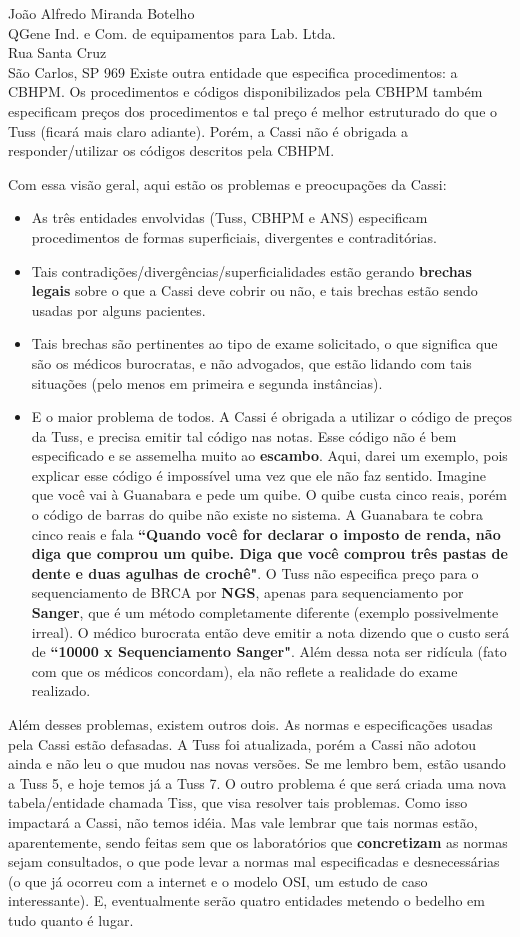 \documentclass{letter}
\begin{document}
\begin{letter}{João Alfredo Miranda Botelho \\ QGene Ind. e Com. de equipamentos para Lab. Ltda. \\ Rua Santa Cruz \\ São Carlos, SP 969}
Existe outra entidade que especifica procedimentos: a CBHPM. Os procedimentos e códigos disponibilizados pela CBHPM também especificam
preços dos procedimentos e tal preço é melhor estruturado do que o Tuss (ficará mais claro adiante). Porém, a Cassi não é obrigada a
responder/utilizar os códigos descritos pela CBHPM.

Com essa visão geral, aqui estão os problemas e preocupações da Cassi:
\begin{itemize}
\item As três entidades envolvidas (Tuss, CBHPM e ANS) especificam procedimentos de formas superficiais, divergentes e contraditórias.
\item Tais contradições/divergências/superficialidades estão gerando \textbf{brechas legais} sobre o que a Cassi deve cobrir ou não, e tais
brechas estão sendo usadas por alguns pacientes.
\item Tais brechas são pertinentes ao tipo de exame solicitado, o que significa que são os médicos burocratas, e não advogados, que estão lidando
com tais situações (pelo menos em primeira e segunda instâncias).
\item E o maior problema de todos. A Cassi é obrigada a utilizar o código de preços da Tuss, e precisa emitir tal código nas notas. 
Esse código não é bem especificado e se assemelha muito ao \textbf{escambo}. Aqui, darei um exemplo, pois explicar esse código 
é impossível uma vez que ele não faz sentido. Imagine que você vai à Guanabara e pede um quibe. O quibe custa cinco reais, porém o código
de barras do quibe não existe no sistema. A Guanabara te cobra cinco reais e fala \textbf{``Quando você for declarar o imposto de renda, não diga
que comprou um quibe. Diga que você comprou três pastas de dente e duas agulhas de crochê"}. O Tuss não especifica preço para o sequenciamento
de BRCA por \textbf{NGS}, apenas para sequenciamento por \textbf{Sanger}, que é um método completamente diferente (exemplo possivelmente irreal). 
O médico burocrata então deve emitir a nota dizendo que o custo será de \textbf{``10000 x Sequenciamento Sanger"}. 
Além dessa nota ser ridícula (fato com que os médicos concordam), ela não reflete a realidade do exame realizado.
\end{itemize}

Além desses problemas, existem outros dois. As normas e especificações usadas pela Cassi estão defasadas. A Tuss foi atualizada, porém a Cassi não
adotou ainda e não leu o que mudou nas novas versões. Se me lembro bem, estão usando a Tuss 5, e hoje temos já a Tuss 7. O outro problema é que
será criada uma nova tabela/entidade chamada Tiss, que visa resolver tais problemas. Como isso impactará a Cassi, não temos idéia. Mas vale lembrar que
tais normas estão, aparentemente, sendo feitas sem que os laboratórios que \textbf{concretizam} as normas sejam consultados, o que pode levar a
normas mal especificadas e desnecessárias (o que já ocorreu com a internet e o modelo OSI, um estudo de caso interessante). E, eventualmente serão
quatro entidades metendo o bedelho em tudo quanto é lugar.


\end{letter}
\end{document}
